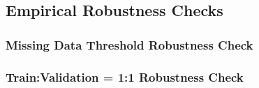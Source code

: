 \documentclass[11pt, a4paper, table]{article}
\begin{document}



\subsection{Empirical Robustness Checks}

\subsubsection{Missing Data Threshold Robustness Check}



%
%
%
%
%
%
%

\FloatBarrier
\subsubsection{Train:Validation = 1:1 Robustness Check}





\FloatBarrier

\end{document}
